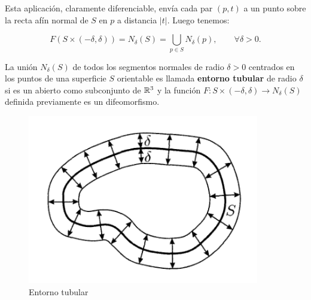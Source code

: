 Esta aplicación, claramente diferenciable, envía cada par $(p,t)$ a un punto sobre la recta afín normal de $S$ en $p$ a distancia $|t|$. Luego tenemos:

\begin{equation*}
    F(S \times (-\delta, \delta)) = N_\delta(S)=\bigcup_{p\in S} N_\delta(p), \qquad \forall \delta > 0.
\end{equation*}

\begin{definition}
La unión $N_\delta(S)$ de todos los segmentos normales de radio $\delta > 0$ centrados en los puntos de una superficie $S$ orientable es llamada \textbf{entorno tubular} de radio $\delta$ si es un abierto como subconjunto de $\mathbb{R}^3$ y la función $F: S \times (-\delta, \delta) \longrightarrow N_\delta(S)$ definida previamente es un difeomorfismo.
\end{definition}

\begin{figure}[h]
  \centering
  \includegraphics[width=0.9\textwidth]{gfx/tubular_neighbourhoods.png}
  \caption{Entorno tubular}
\end{figure}

